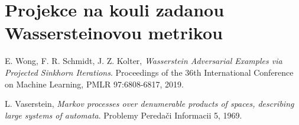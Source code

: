 \documentclass[czech]{article}
\begin{document}
\section{Projekce na kouli zadanou Wassersteinovou metrikou}




\begin{thebibliography}{1}

 E. Wong, F. R. Schmidt, J. Z. Kolter,
\emph{Wasserstein Adversarial Examples via Projected Sinkhorn Iterations}.
Proceedings of the 36th International Conference on Machine Learning, PMLR 97:6808-6817, 2019.

 L. Vaserstein,
\emph{Markov processes over denumerable products of spaces, describing large systems of automata}.
Problemy Peredači Informacii 5, 1969.

\end{thebibliography}
\end{document}
